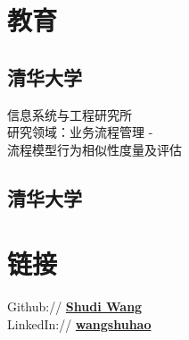 \documentclass[]{resume_zh}
\begin{document}
\begin{minipage}[t]{0.3\textwidth} 


\section{教育} 

\subsection{清华大学}
信息系统与工程研究所\\
研究领域：业务流程管理 - \\
流程模型行为相似性度量及评估
\sectionsep

\subsection{清华大学}
\sectionsep


\section{链接} 
Github:// \href{https://github.com/shudiwsh2009}{\bf Shudi Wang} \\
LinkedIn://  \href{https://cn.linkedin.com/in/wangshuhao}{\bf wangshuhao} \\
\sectionsep




\end{minipage}
\end{document}
